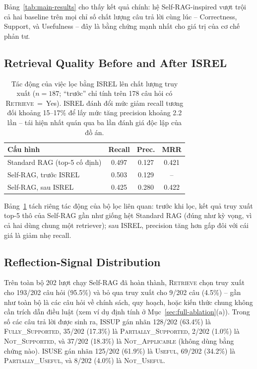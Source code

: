 \documentclass[11pt]{article}
\begin{document}
Bảng~\ref{tab:main-results} cho thấy kết quả chính: hệ Self-RAG-inspired vượt trội cả hai baseline trên mọi chỉ số chất lượng câu trả lời cùng lúc -- Correctness, Support, và Usefulness -- đây là bằng chứng mạnh nhất cho giá trị của cơ chế phản tư.

\subsection{Retrieval Quality Before and After \textsc{ISREL}}

\begin{table}[t]
\centering
\small
\begin{tabular}{@{}lccc@{}}
\toprule
\textbf{Cấu hình} & \textbf{Recall} & \textbf{Prec.} & \textbf{MRR} \\
\midrule
Standard RAG (top-5 cố định) & 0.497 & 0.127 & 0.421 \\
Self-RAG, trước \textsc{ISREL} & 0.503 & 0.129 & -- \\
Self-RAG, sau \textsc{ISREL} & 0.425 & 0.280 & 0.422 \\
\bottomrule
\end{tabular}
\caption{Tác động của việc lọc bằng \textsc{ISREL} lên chất lượng truy xuất ($n=187$; ``trước'' chỉ tính trên 178 câu hỏi có \textsc{Retrieve}~=~Yes). \textsc{ISREL} đánh đổi mức giảm recall tương đối khoảng 15--17\% để lấy mức tăng precision khoảng 2.2 lần -- tái hiện nhất quán qua ba lần đánh giá độc lập của đồ án.}
\label{tab:retrieval-ablation}
\end{table}

Bảng~\ref{tab:retrieval-ablation} tách riêng tác động của bộ lọc liên quan: trước khi lọc, kết quả truy xuất top-5 thô của Self-RAG gần như giống hệt Standard RAG (đúng như kỳ vọng, vì cả hai dùng chung một retriever); sau \textsc{ISREL}, precision tăng hơn gấp đôi với cái giá là giảm nhẹ recall.

\subsection{Reflection-Signal Distribution}

Trên toàn bộ 202 lượt chạy Self-RAG đã hoàn thành, \textsc{Retrieve} chọn truy xuất cho 193/202 câu hỏi (95.5\%) và bỏ qua truy xuất cho 9/202 câu (4.5\%) -- gần như toàn bộ là các câu hỏi về chính sách, quy hoạch, hoặc kiến thức chung không cần trích dẫn điều luật (xem ví dụ định tính ở Mục~\ref{sec:full-ablation}(a)). Trong số các câu trả lời được sinh ra, \textsc{ISSUP} gán nhãn 128/202 (63.4\%) là \textsc{Fully\_Supported}, 35/202 (17.3\%) là \textsc{Partially\_Supported}, 2/202 (1.0\%) là \textsc{Not\_Supported}, và 37/202 (18.3\%) là \textsc{Not\_Applicable} (không dùng bằng chứng nào). \textsc{ISUSE} gán nhãn 125/202 (61.9\%) là \textsc{Useful}, 69/202 (34.2\%) là \textsc{Partially\_Useful}, và 8/202 (4.0\%) là \textsc{Not\_Useful}.
\end{document}
